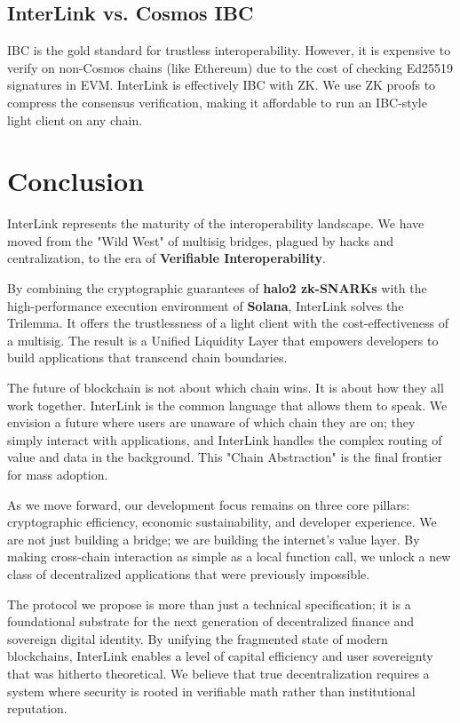 \documentclass[11pt,a4paper]{article}
\begin{document}
\subsection{InterLink vs. Cosmos IBC}
IBC is the gold standard for trustless interoperability. However, it is expensive to verify on non-Cosmos chains (like Ethereum) due to the cost of checking Ed25519 signatures in EVM. InterLink is effectively IBC with ZK. We use ZK proofs to compress the consensus verification, making it affordable to run an IBC-style light client on any chain.

\section{Conclusion}

InterLink represents the maturity of the interoperability landscape. We have moved from the "Wild West" of multisig bridges, plagued by hacks and centralization, to the era of \textbf{Verifiable Interoperability}.

By combining the cryptographic guarantees of \textbf{halo2 zk-SNARKs} with the high-performance execution environment of \textbf{Solana}, InterLink solves the Trilemma. It offers the trustlessness of a light client with the cost-effectiveness of a multisig. The result is a Unified Liquidity Layer that empowers developers to build applications that transcend chain boundaries.

The future of blockchain is not about which chain wins. It is about how they all work together. InterLink is the common language that allows them to speak. We envision a future where users are unaware of which chain they are on; they simply interact with applications, and InterLink handles the complex routing of value and data in the background. This "Chain Abstraction" is the final frontier for mass adoption.

As we move forward, our development focus remains on three core pillars: cryptographic efficiency, economic sustainability, and developer experience. We are not just building a bridge; we are building the internet's value layer. By making cross-chain interaction as simple as a local function call, we unlock a new class of decentralized applications that were previously impossible.

The protocol we propose is more than just a technical specification; it is a foundational substrate for the next generation of decentralized finance and sovereign digital identity. By unifying the fragmented state of modern blockchains, InterLink enables a level of capital efficiency and user sovereignty that was hitherto theoretical. We believe that true decentralization requires a system where security is rooted in verifiable math rather than institutional reputation.
\end{document}
